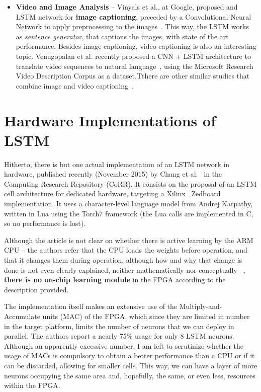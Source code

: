 \begin{itemize}
    \item \textbf{Video and Image Analysis} -- Vinyals et al., at Google, proposed and LSTM network for \textbf{image captioning}, preceded by a Convolutional Neural Network to apply preprocessing to the images~\cite{Vinyals14}. This way, the LSTM works as \emph{sentence generator}, that captions the images, with state of the art performance. 
        Besides image captioning, video captioning is also an interesting topic. Venugopalan et al. recently proposed a CNN + LSTM architecture to translate video sequences to natural language~\cite{Donahue14}, using the Microsoft Research Video Description Corpus as a dataset.Tthere are other similar studies that combine image and video captioning~\cite{Donahue14_2}.


\end{itemize}




\section{Hardware Implementations of LSTM}\label{sec:sa_hardware}
Hitherto, there is but one actual implementation of an LSTM network in hardware, published recently (November 2015) by Chang et al.~\cite{Chang15} in the Computing Research Repository (CoRR). It consists on the proposal of an LSTM cell architecture for dedicated hardware, targeting a Xilinx\textregistered~ Zedboard implementation. It uses a character-level language model from Andrej Karpathy, written in Lua using the Torch7 framework (the Lua calls are implemented in C, so no performance is lost).

Although the article is not clear on whether there is active learning by the ARM CPU -- the authors refer that the CPU loads the weights before operation, and that it changes them during operation, although how and why that change is done is not even clearly explained, neither mathematically nor conceptually --, \textbf{there is no on-chip learning module} in the FPGA according to the description provided. 

The implementation itself makes an extensive use of the Multiply-and-Accumulate units (MAC) of the FPGA, which since they are limited in number in the target platform, limits the number of neurons that we can deploy in parallel. The authors report a nearly 75\% usage for only 8 LSTM neurons. Although an apparently excessive number, I am left to scrutinize whether the usage of MACs is compulsory to obtain a better performance than a CPU or if it can be discarded, allowing for smaller cells. This way, we can have a layer of more neurons occupying the same area and, hopefully, the same, or even less, resources within the FPGA.

